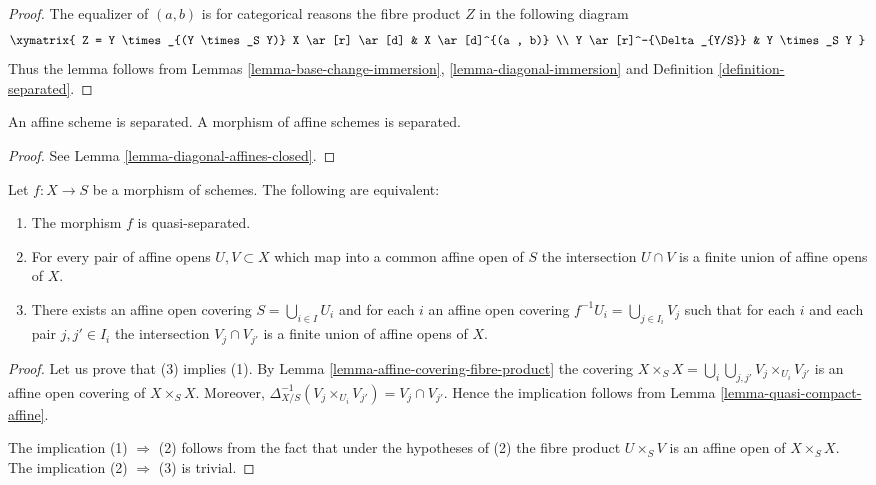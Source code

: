 \begin{proof}
The equalizer of $(a, b)$ is for categorical reasons
the fibre product $Z$ in the following diagram
$$
\xymatrix{
Z = Y \times_{(Y \times_S Y)} X \ar[r] \ar[d] &
 X \ar[d]^{(a , b)} \\
Y \ar[r]^-{\Delta_{Y/S}} & Y \times_S Y
}
$$
Thus the lemma follows from Lemmas
\ref{lemma-base-change-immersion}, \ref{lemma-diagonal-immersion} and
Definition \ref{definition-separated}.
\end{proof}

\begin{lemma}
\label{lemma-affine-separated}
An affine scheme is separated.
A morphism of affine schemes is separated.
\end{lemma}

\begin{proof}
See Lemma \ref{lemma-diagonal-affines-closed}.
\end{proof}

\begin{lemma}
\label{lemma-characterize-quasi-separated}
Let $f : X \to S$ be a morphism of schemes.
The following are equivalent:
\begin{enumerate}
\item The morphism $f$ is quasi-separated.
\item For every pair of affine opens $U, V \subset X$
which map into a common affine open of $S$ the intersection
$U \cap V$ is a finite union of affine opens of $X$.
\item There exists an affine open covering $S = \bigcup_{i \in I} U_i$
and for each $i$ an affine open covering $f^{-1}U_i = \bigcup_{j \in I_i} V_j$
such that for each $i$ and each pair $j, j' \in I_i$ the
intersection $V_j \cap V_{j'}$ is a finite union of affine
opens of $X$.
\end{enumerate}
\end{lemma}

\begin{proof}
Let us prove that (3) implies (1).
By Lemma \ref{lemma-affine-covering-fibre-product}
the covering $X \times_S X = \bigcup_i \bigcup_{j, j'} V_j \times_{U_i} V_{j'}$
is an affine open covering of $X \times_S X$.
Moreover, $\Delta_{X/S}^{-1}(V_j \times_{U_i} V_{j'}) = V_j \cap V_{j'}$.
Hence the implication follows from Lemma \ref{lemma-quasi-compact-affine}.

\medskip\noindent
The implication (1) $\Rightarrow$ (2) follows from the fact
that under the hypotheses of (2) the fibre product
$U \times_S V$ is an affine open of $X \times_S X$.
The implication (2) $\Rightarrow$ (3) is trivial.
\end{proof}

